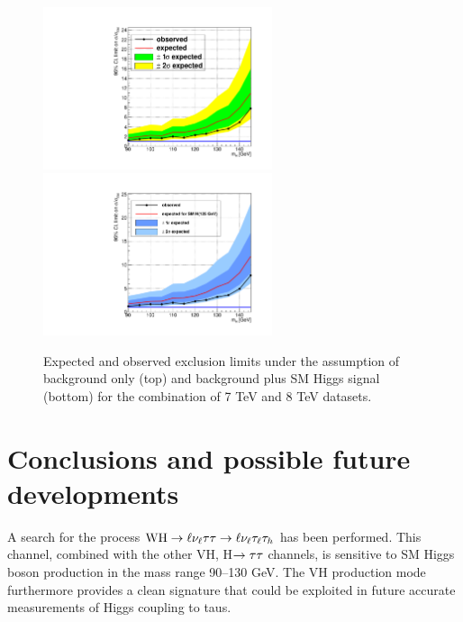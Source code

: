 \begin{figure}
\begin{center}
  \includegraphics[width=0.6\textwidth]{4_Analisys/pics/limits/vhtt_wh/vhtt_wh.pdf}\\
  \includegraphics[width=0.6\textwidth]{4_Analisys/pics/limits/vhtt_wh/vhtt_wh_injected.pdf}
  \caption{Expected and observed exclusion limits under the assumption of background only (top) and background plus SM Higgs signal (bottom) for the combination of 7 TeV and 8 TeV datasets.}
  \label{fig:llt_limits}
\end{center}
\end{figure}


\chapter{Conclusions and possible future developments}

A search for the process $\mathrm{W}\mathrm{H}\rightarrow\ell\nu_\ell\tau\tau \rightarrow \ell \nu_\ell \tau_\ell \tau_h$ has been performed. This channel, combined with the other VH, H$\rightarrow\tau\tau$ channels, is sensitive to SM Higgs boson production in the mass range 90--130 GeV. The VH production mode furthermore provides a clean signature that could be exploited in future accurate measurements of Higgs coupling to taus.

